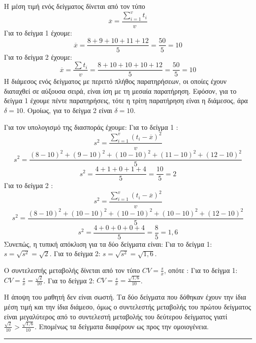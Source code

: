 
\begin{alist}
\item Η μέση τιμή ενός δείγματος δίνεται από τον τύπο
\[ \overline{x} = \frac{\sum_{i=1}^{v} t_i}{v} \]
Για το δείγμα 1 έχουμε:
\[ \overline{x} = \frac{8+9+10+11+12}{5} = \frac{50}{5} = 10 \]
Για το δείγμα 2 έχουμε:
\[ \overline{x} = \frac{\sum t_i}{v} = \frac{8+10+10+10+12}{5} = \frac{50}{5} = 10 \]
Η διάμεσος ενός δείγματος με περιττό πλήθος παρατηρήσεων, οι οποίες έχουν διαταχθεί σε αύξουσα σειρά, είναι ίση με τη μεσαία παρατήρηση. Εφόσον, για το δείγμα 1 έχουμε πέντε παρατηρήσεις, τότε η τρίτη παρατήρηση είναι η διάμεσος, άρα $\delta = 10$.
Ομοίως, για το δείγμα 2 είναι $\delta = 10$.

\item Για τον υπολογισμό της διασποράς έχουμε:
Για το δείγμα 1 :
\[ s^2 = \frac{\sum_{i=1}^{v} (t_i - \overline{x})^2}{v} \]
\[ s^2 = \frac{(8-10)^2 + (9-10)^2 + (10-10)^2 + (11-10)^2 + (12-10)^2}{5} \]
\[ s^2 = \frac{4+1+0+1+4}{5} = \frac{10}{5} = 2 \]
Για το δείγμα 2 :
\[ s^2 = \frac{\sum_{i=1}^{v} (t_i - \overline{x})^2}{v} \]
\[ s^2 = \frac{(8-10)^2 + (10-10)^2 + (10-10)^2 + (10-10)^2 + (12-10)^2}{5} \]
\[ s^2 = \frac{4+0+0+0+4}{5} = \frac{8}{5} = 1,6 \]
Συνεπώς, η τυπική απόκλιση για τα δύο δείγματα είναι:
Για το δείγμα 1: $s = \sqrt{s^2} = \sqrt{2}$.
Για το δείγμα 2: $s = \sqrt{s^2} = \sqrt{1,6}$.

\item Ο συντελεστής μεταβολής δίνεται από τον τύπο $CV = \frac{s}{\overline{x}}$, οπότε :
Για το δείγμα 1: $CV = \frac{s}{\overline{x}} = \frac{\sqrt{2}}{10}$.
Για το δείγμα 2: $CV = \frac{s}{\overline{x}} = \frac{\sqrt{1,6}}{10}$.

\item Η άποψη του μαθητή δεν είναι σωστή. Τα δύο δείγματα που δόθηκαν έχουν την ίδια μέση τιμή και την ίδια διάμεσο, όμως ο συντελεστής μεταβολής του πρώτου δείγματος είναι μεγαλύτερος από το συντελεστή μεταβολής του δεύτερου δείγματος γιατί $\frac{\sqrt{2}}{10} > \frac{\sqrt{1,6}}{10}$. Επομένως τα δείγματα διαφέρουν ως προς την ομοιογένεια.
\end{alist}
\vspace{6mm}
\noindent\rule{\textwidth}{0.4pt}
\vspace{6mm}


